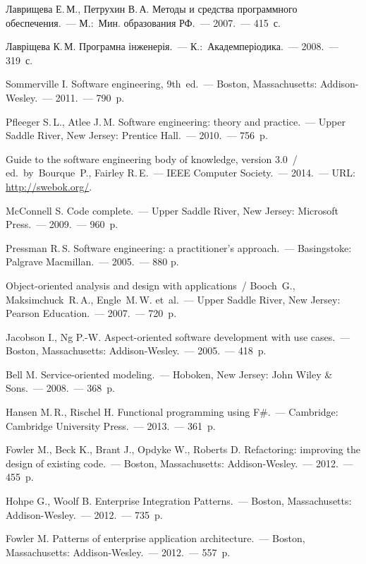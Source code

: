 \documentclass[a4paper,10pt]{article}
\begin{document}
\begin{thebibliography}{99}
    Лаврищева Е.\,М., Петрухин В.\,А.
	Методы и средства программного обеспечения.~— М.:~Мин. образования РФ.~— 2007.~— 415~с.

    Лавріщева К.\,М.
	Програмна інженерія.~— К.:~Академперіодика.~— 2008.~— 319~с.

	\begin{otherlanguage}{english}
    Sommerville I. 
	Software engineering, 9th~ed.~— Boston, Massachusetts: Addison-Wesley.~— 2011.~— 790~p.

    Pfleeger S.\,L., Atlee J.\,M.
	Software engineering: theory and practice.~— Upper Saddle River, New Jersey: Prentice Hall.~— 2010.~— 756~p.

    Guide to the software engineering body of knowledge, version 3.0~/ 
	ed.~by~Bourque~P., Fairley R.\,E.~— IEEE Computer Society.~— 2014.~— URL: \url{http://swebok.org/}.

    McConnell S.
	Code complete.~— Upper Saddle River, New Jersey: Microsoft Press.~— 2009.~— 960~p.

    Pressman R.\,S.
	Software engineering: a practitioner’s approach.~— Basingstoke: Palgrave Macmillan.~— 2005.~— 880 p.

    Object-oriented analysis and design with applications~/ 
	Booch~G., Maksimchuck~R.\,A., Engle~M.\,W. et~al.~— 
	Upper Saddle River, New Jersey: Pearson Education.~— 2007.~— 720~p.

    Jacobson I., Ng P.-W.
	Aspect-oriented software development with use cases.~— Boston, Massachusetts: Addison-Wesley.~— 2005.~— 418~p.

    Bell M.
	Service-oriented modeling.~— Hoboken, New Jersey: John Wiley \& Sons.~— 2008.~— 368~p.

    Hansen M.\,R., Rischel H.
	Functional programming using F\#.~— Cambridge: Cambridge University Press.~— 2013.~— 361~p.

    Fowler M., Beck K., Brant J., Opdyke W., Roberts D.
	Refactoring: improving the design of existing code.~— Boston, Massachusetts: Addison-Wesley.~— 2012.~— 455~p.

    Hohpe G., Woolf B.
	Enterprise Integration Patterns.~— Boston, Massachusetts: Addison-Wesley.~— 2012.~— 735~p.

    Fowler M.
	Patterns of enterprise application architecture.~— Boston, Massachusetts: Addison-Wesley.~— 2012.~— 557~p.


\end{otherlanguage}
\end{thebibliography}
\end{document}
